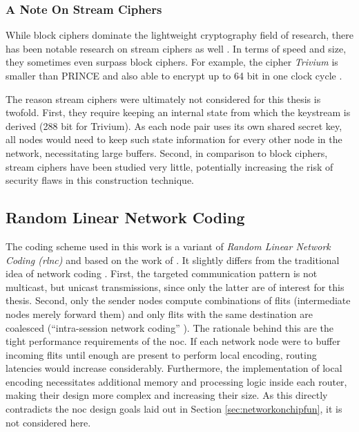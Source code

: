 \subsubsection{A Note On Stream Ciphers}
While block ciphers dominate the lightweight cryptography field of research, there has been notable research on stream ciphers as well
\cite[cf.][]{estream}. In terms of speed and size, they sometimes even surpass block ciphers. For example, the cipher \textit{Trivium}
\cite{decanniere06trivium} is smaller than PRINCE and also able to encrypt up to 64 bit in one clock cycle \cite[8]{harttung17lightweightcrypto}.

The reason stream ciphers were ultimately not considered for this thesis is twofold. First, they require keeping an internal state from which the
keystream is derived (288 bit for Trivium). As each node pair uses its own shared secret key, all nodes would need to keep such state information for
every other node in the network, necessitating large buffers. Second, in comparison to block ciphers, stream ciphers have been studied very little,
potentially increasing the risk of security flaws in this construction technique.

\subsection{Random Linear Network Coding}\label{sec:designnc}
The coding scheme used in this work is a variant of \textit{Random Linear Network Coding (\gls{rlnc})} and based on the work of
\citeauthor{moriam15manycorenc} \cite{moriam15manycorenc}. It slightly differs from the traditional idea of network coding
\cites{ahlswede00networkflow}{li03linearnc}. First, the targeted communication pattern is not multicast, but unicast transmissions, since only the
latter are of interest for this thesis. Second, only the sender nodes compute combinations of flits (intermediate nodes merely forward them) and only
flits with the same destination are coalesced (\enquote{intra-session network coding} \cite[1]{moriam15manycorenc}). The rationale behind this are the
tight performance requirements of the \gls{noc}. If each network node were to buffer incoming flits until enough are present to perform local
encoding, routing latencies would increase considerably. Furthermore, the implementation of local encoding necessitates additional memory and
processing logic inside each router, making their design more complex and increasing their size. As this directly contradicts the \gls{noc} design goals
laid out in Section \ref{sec:networkonchipfun}, it is not considered here.

